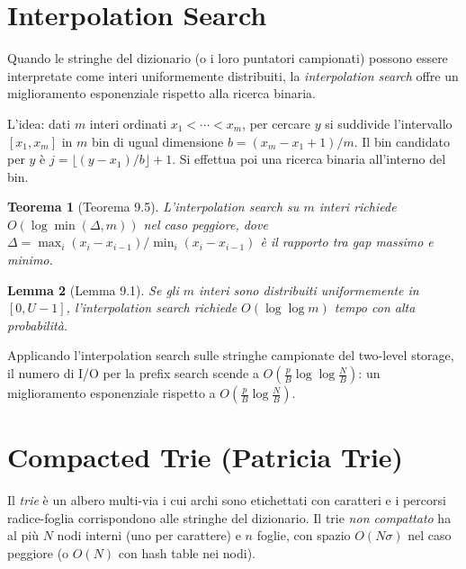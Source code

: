 \documentclass[12pt, a4paper, oneside]{book}
\theoremstyle{plain}
\newtheorem{teorema}{Teorema}[chapter]
\newtheorem{lemma}[teorema]{Lemma}
\theoremstyle{definition}
\theoremstyle{remark}
\begin{document}
\section{Interpolation Search}

Quando le stringhe del dizionario (o i loro puntatori campionati) possono essere interpretate come interi uniformemente distribuiti, la \emph{interpolation search} offre un miglioramento esponenziale rispetto alla ricerca binaria.

L'idea: dati $m$ interi ordinati $x_1 < \cdots < x_m$, per cercare $y$ si suddivide l'intervallo $[x_1, x_m]$ in $m$ bin di ugual dimensione $b = (x_m - x_1 + 1)/m$. Il bin candidato per $y$ è $j = \lfloor(y - x_1)/b\rfloor + 1$. Si effettua poi una ricerca binaria all'interno del bin.

\begin{teorema}[Teorema 9.5]
L'interpolation search su $m$ interi richiede $O(\log\min(\Delta, m))$ nel caso peggiore, dove $\Delta = \max_i(x_i - x_{i-1})/\min_i(x_i - x_{i-1})$ è il rapporto tra gap massimo e minimo.
\end{teorema}

\begin{lemma}[Lemma 9.1]
Se gli $m$ interi sono distribuiti uniformemente in $[0, U-1]$, l'interpolation search richiede $O(\log\log m)$ tempo con alta probabilità.
\end{lemma}

Applicando l'interpolation search sulle stringhe campionate del two-level storage, il numero di I/O per la prefix search scende a $O\!\left(\frac{p}{B}\log\log\frac{N}{B}\right)$: un miglioramento esponenziale rispetto a $O\!\left(\frac{p}{B}\log\frac{N}{B}\right)$.

\section{Compacted Trie (Patricia Trie)}

Il \emph{trie} è un albero multi-via i cui archi sono etichettati con caratteri e i percorsi radice-foglia corrispondono alle stringhe del dizionario. Il trie \emph{non compattato} ha al più $N$ nodi interni (uno per carattere) e $n$ foglie, con spazio $O(N\sigma)$ nel caso peggiore (o $O(N)$ con hash table nei nodi).
\end{document}
